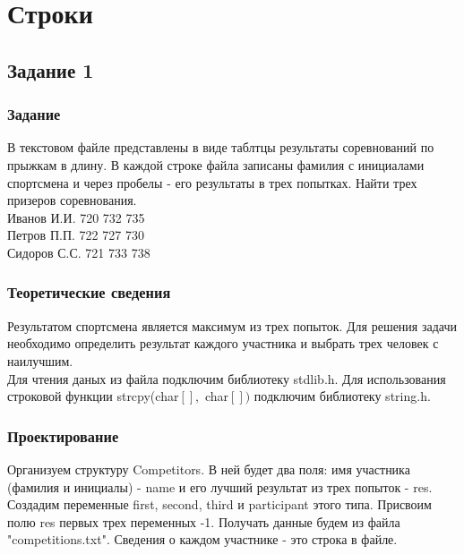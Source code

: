 \documentclass[12pt,a4paper]{report}
\begin{document}
\chapter{Строки}
\section{Задание 1}
\subsection{Задание}
В текстовом файле представлены в виде таблтцы результаты соревнований по прыжкам в длину. В каждой строке файла записаны фамилия с инициалами спортсмена и через пробелы - его результаты в трех попытках. Найти трех призеров соревнования. \\
Иванов И.И. 720 732 735 \\
Петров П.П. 722 727 730 \\
Сидоров С.С. 721 733 738 \\
\subsection{Теоретические сведения}
Результатом спортсмена является максимум из трех попыток. Для решения задачи необходимо определить результат каждого участника и выбрать трех человек с наилучшим. \\
Для чтения даных из файла подключим библиотеку stdlib.h. Для использования строковой функции strcpy(char$[],$ char$[])$ подключим библиотеку string.h. 
\subsection{Проектирование}
Организуем структуру Competitors. В ней будет два поля: имя участника (фамилия и инициалы) - name и его лучший результат из трех попыток - res. Создадим переменные first, second, third и participant этого типа. Присвоим полю res первых трех переменных -1. Получать данные будем из файла "competitions.txt". Сведения о каждом участнике - это строка в файле. \\
\end{document}
